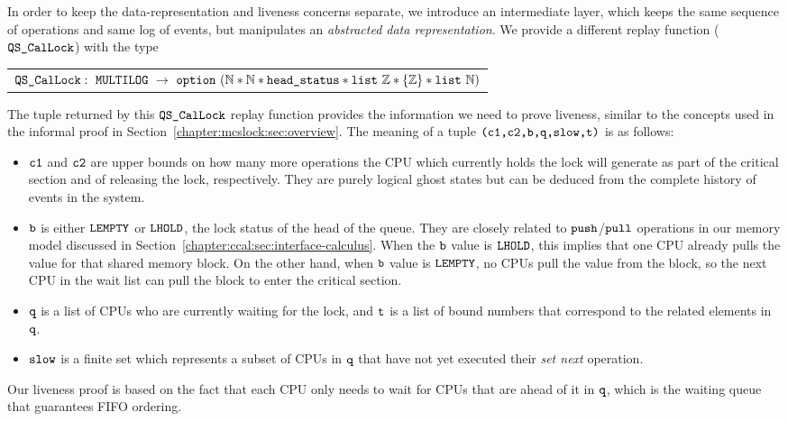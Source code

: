 In order to keep the data-representation and liveness concerns separate,
we introduce an intermediate layer, which keeps the same sequence of operations and same log of events, 
but manipulates an \emph{abstracted data representation}.
We provide a different replay function (${\mathrm{\texttt{QS\_CalLock}}}$) with the type \newline
\begin{tabular}{P{0.95\textwidth}}
$\QSCalLock :\ \lockmultilog\ \rightarrow\ \optiondef\ (\nattype * \nattype * \codeinmath{head\_status} * \codeinmath{list} \ \ztype *  \set{\ztype} * \codeinmath{list} \ \nattype)$\\
\end{tabular}\newline
The tuple returned by this ${\mathrm{\texttt{QS\_CalLock}}}$ replay function provides the information we
need to prove liveness, 
similar to the concepts used in the informal
proof in Section~\ref{chapter:mcslock:sec:overview}. 
The meaning of a tuple ${\mathrm{\texttt{(c1,c2,b,q,slow,t)}}}$ is as follows:
\begin{itemize}
\item  ${\mathrm{\texttt{c1}}}$ and ${\mathrm{\texttt{c2}}}$ are upper bounds on how many more operations 
the CPU which currently holds the lock will generate as part of the critical section and of 
releasing the lock, respectively. They are purely logical ghost states but can be deduced from the complete
history of events in the system.

\item ${\mathrm{\texttt{b}}}$ is either  ${\mathrm{\texttt{LEMPTY}}}$ or  ${\mathrm{\texttt{LHOLD}}}$, 
the lock status of the head of the queue.
They are closely related to ${\mathrm{\texttt{push}}}$/${\mathrm{\texttt{pull}}}$ operations in our memory model discussed in Section~\ref{chapter:ccal:sec:interface-calculus}.
When the ${\mathrm{\texttt{b}}}$ value is ${\mathrm{\texttt{LHOLD}}}$, this implies that one CPU already pulls the value for that shared memory block.
On the other hand, when ${\mathrm{\texttt{b}}}$ value is ${\mathrm{\texttt{LEMPTY}}}$, no CPUs pull the value from the block, so the next CPU in the wait list 
can pull the block to enter the critical section.

\item ${\mathrm{\texttt{q}}}$ is a list of  CPUs who are currently waiting for the lock, 
and ${\mathrm{\texttt{t}}}$ is a list of bound numbers that 
correspond to the related elements in ${\mathrm{\texttt{q}}}$.

\item ${\mathrm{\texttt{slow}}}$ is a finite set which represents a subset of CPUs in ${\mathrm{\texttt{q}}}$ that have not yet executed their \emph{set next} operation.  
\end{itemize}
Our liveness proof is based on the fact that each CPU only needs to wait for CPUs that are ahead of it in ${\mathrm{\texttt{q}}}$, which is the waiting queue that guarantees FIFO ordering.

